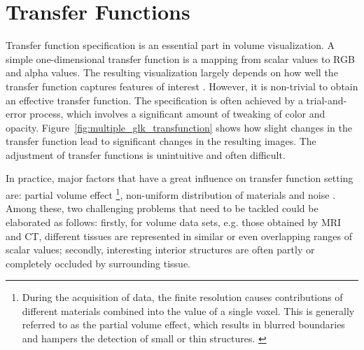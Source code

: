 \documentclass{egpubl}
\begin{document}
\section{Transfer Functions}
Transfer function specification is an essential part in volume visualization.
A simple one-dimensional transfer function is a mapping from scalar values to RGB and alpha values.
The resulting visualization largely depends on how well the transfer function captures features of interest \cite{kniss_multidimensional_2002}.
However, it is non-trivial to obtain an effective transfer function. The specification is often achieved by a trial-and-error process, which involves a significant amount of tweaking of color and opacity. Figure~\ref{fig:multiple_glk_transfunction} shows how slight changes in the transfer function lead to significant changes in the resulting images. The adjustment of transfer functions is unintuitive and often difficult.

In practice, major factors that have a great influence on transfer function setting are: partial volume effect \footnote{During the acquisition of data, the finite resolution causes contributions of different materials combined into the value of a single voxel. This is generally referred to as the partial volume effect, which results in blurred boundaries and hampers the detection of small or thin structures. \cite{serlie_classifying_2007}}, non-uniform distribution of materials and noise \cite{serlie_computed_2003}.
Among these, two challenging problems that need to be tackled could be elaborated as follows: firstly, for volume data sets, e.g. those obtained by MRI and CT, different tissues are represented in similar or even overlapping ranges of scalar values; secondly, interesting interior structures are often partly or completely occluded by surrounding tissue.
\end{document}
